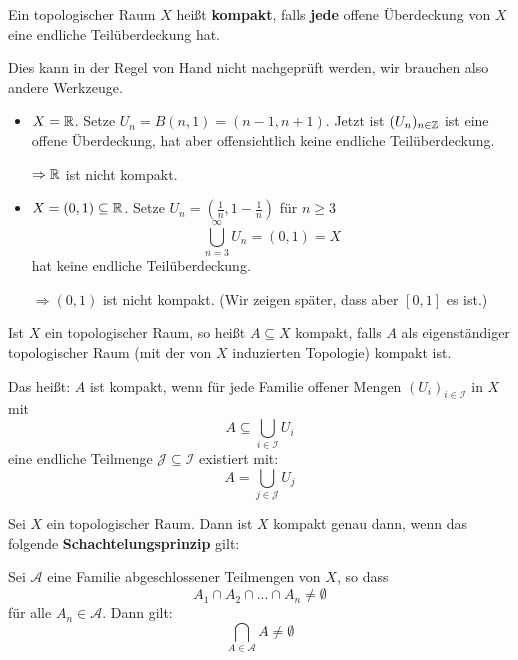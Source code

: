 \documentclass[main.tex]{subfiles}
\begin{document}
\begin{Definition}[Kompaktheit]
  Ein topologischer Raum $X$ heißt \textbf{kompakt}, falls \textbf{jede} offene Überdeckung von $X$ eine endliche Teilüberdeckung hat.
\end{Definition}

\begin{Bemerkung}
  Dies kann in der Regel von Hand nicht nachgeprüft werden, wir brauchen also andere Werkzeuge.
\end{Bemerkung}

\begin{Beispiel}[Gegenbeispiele]
  \begin{itemize}
    \item $X = \mathbb{R}$. Setze $U_n = B(n, 1) = (n-1,n+1)$. Jetzt ist $(U_n)_{n \in \mathbb{Z}}$ ist eine offene Überdeckung, hat aber offensichtlich keine endliche Teilüberdeckung.

      $\Rightarrow \mathbb{R}$ ist nicht kompakt.
    \item $X = (0,1) \subseteq \mathbb{R}$. Setze $U_n = \left(\frac{1}{n}, 1- \frac{1}{n}\right)$ für $n \geq 3$
      $$\bigcup_{n=3}^\infty U_n = (0,1) = X$$
      hat keine endliche Teilüberdeckung.

      $\Rightarrow (0,1)$ ist nicht kompakt. (Wir zeigen später, dass aber $[0,1]$ es ist.)
  \end{itemize}
\end{Beispiel}

\begin{Bemerkung}
  Ist $X$ ein topologischer Raum, so heißt $A \subseteq X$ kompakt, falls $A$ als eigenständiger topologischer Raum (mit der von $X$ induzierten Topologie) kompakt ist.

  Das heißt: $A$ ist kompakt, wenn für jede Familie offener Mengen $(U_i)_{i \in \mathcal{I}}$ in $X$ mit
  $$A \subseteq \bigcup_{i \in \mathcal{I}} U_i$$
  eine endliche Teilmenge $\mathcal{J} \subseteq \mathcal{I}$ existiert mit:
  $$A = \bigcup_{j \in \mathcal{J}} U_j$$
\end{Bemerkung}

\begin{Theorem}[Schachtelungsprinzip]
  Sei $X$ ein topologischer Raum. Dann ist $X$ kompakt genau dann, wenn das folgende \textbf{Schachtelungsprinzip} gilt:

  Sei  $\mathcal{A}$ eine Familie abgeschlossener Teilmengen von $X$, so dass
  $$A_1 \cap A_2 \cap ... \cap A_n \neq \emptyset$$
  für alle $A_n \in \mathcal{A}$. Dann gilt:
  $$\bigcap_{A \in \mathcal{A}} A \neq \emptyset$$
\end{Theorem}
\end{document}
